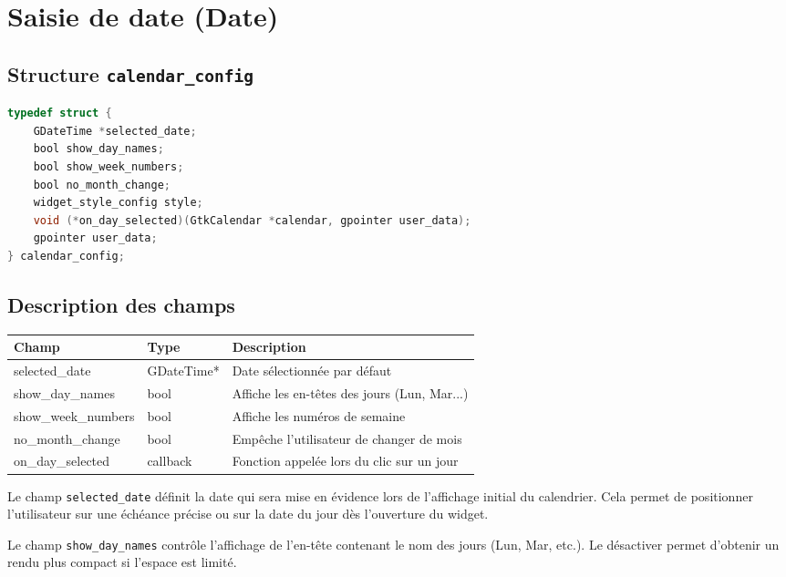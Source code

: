 \section{Saisie de date (Date)}

\subsection{Structure \texttt{calendar\_config}}
\begin{lstlisting}[language=C]
typedef struct {
    GDateTime *selected_date;
    bool show_day_names;
    bool show_week_numbers;
    bool no_month_change;
    widget_style_config style;
    void (*on_day_selected)(GtkCalendar *calendar, gpointer user_data);
    gpointer user_data;
} calendar_config;
\end{lstlisting}

\subsection{Description des champs}
\begin{center}
\begin{tabular}{|l|l|>{\raggedright\arraybackslash}p{6cm}|}
\hline
\textbf{Champ} & \textbf{Type} & \textbf{Description} \\
\hline
selected\_date & GDateTime* & Date sélectionnée par défaut \\
\hline
show\_day\_names & bool & Affiche les en-têtes des jours (Lun, Mar...) \\
\hline
show\_week\_numbers & bool & Affiche les numéros de semaine \\
\hline
no\_month\_change & bool & Empêche l'utilisateur de changer de mois \\
\hline
on\_day\_selected & callback & Fonction appelée lors du clic sur un jour \\
\hline
\end{tabular}
\end{center}

\bigskip

Le champ \texttt{selected\_date} définit la date qui sera mise en évidence lors de l'affichage initial du calendrier. Cela permet de positionner l'utilisateur sur une échéance précise ou sur la date du jour dès l'ouverture du widget.

Le champ \texttt{show\_day\_names} contrôle l'affichage de l'en-tête contenant le nom des jours (Lun, Mar, etc.). Le désactiver permet d'obtenir un rendu plus compact si l'espace est limité.

